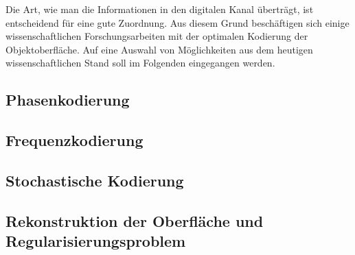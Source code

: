 \noindent
Die Art, wie man die Informationen in den digitalen Kanal überträgt, ist entscheidend für eine gute Zuordnung.
Aus diesem Grund beschäftigen sich einige wissenschaftlichen Forschungsarbeiten mit der optimalen Kodierung der Objektoberfläche.
Auf eine Auswahl von Möglichkeiten aus dem heutigen wissenschaftlichen Stand soll im Folgenden eingegangen werden.
%
{
	\FloatBarrier
    \subsection{Phasenkodierung}
    \label{sub:phasenKodierung}
    
}
%
{
	\FloatBarrier
    \subsection{Frequenzkodierung}
    \label{sub:frequenzKodierung}
    
}
%
{
	\FloatBarrier
    \subsection{Stochastische Kodierung}
    \label{sub:stochastischeKodierung}
    
}
%
{
	\FloatBarrier
    \subsection{Rekonstruktion der Oberfläche und Regularisierungsproblem}
    \label{sub:rekonstruktionUndRegularisierungsproblem}
    
}
%
